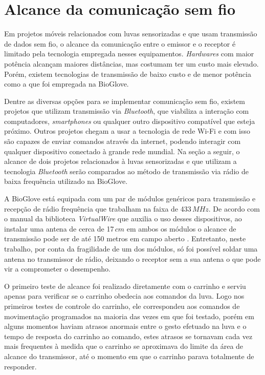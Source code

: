 \documentclass[
	12pt,				%
	openright,			%
	oneside,			%
	a4paper,			%
	english,			%
	brazil				%
	]{abntex2}
\begin{document}
			\section{Alcance da comunicação sem fio}

		Em projetos móveis relacionados com luvas sensorizadas e que usam transmissão de dados sem fio, o alcance da comunicação entre o emissor e o receptor é limitado pela tecnologia empregada nesses equipamentos. \textit{Hardwares} com maior potência alcançam maiores distâncias, mas costumam ter um custo mais elevado. Porém, existem tecnologias de transmissão de baixo custo e de menor potência como a que foi empregada na BioGlove. 
			
		Dentre as diversas opções para se implementar comunicação sem fio, existem projetos que utilizam transmissão via \textit{Bluetooth}, que viabiliza a interação com computadores, \textit{smartphones} ou qualquer outro dispositivo compatível que esteja próximo. Outros projetos chegam a usar a tecnologia de rede Wi-Fi e com isso são capazes de enviar comandos através da internet, podendo interagir com qualquer dispositivo conectado à grande rede mundial. Na seção a seguir, o alcance de dois projetos relacionados à luvas sensorizadas e que utilizam a tecnologia \textit{Bluetooth} serão comparados ao método de transmissão via rádio de baixa frequência utilizado na BioGlove.

		A BioGlove está equipada com um par de módulos genéricos para transmissão e recepção de rádio frequência que trabalham na faixa de 433$\,MHz$. De acordo com o manual da biblioteca \textit{VirtualWire} que auxilia o uso desses dispositivos, ao instalar uma antena de cerca de 17$\,cm$ em ambos os módulos o alcance de transmissão pode ser de até 150 metros em campo aberto \cite{virtualwiremanual}. Entretanto, neste trabalho, por conta da fragilidade de um dos módulos, só foi possível soldar uma antena no transmissor de rádio, deixando o receptor sem a sua antena o que pode vir a comprometer o desempenho.

		O primeiro teste de alcance foi realizado diretamente com o carrinho e serviu apenas para verificar se o carrinho obedecia aos comandos da luva. Logo nos primeiros testes de controle do carrinho, ele correspondeu aos comandos de movimentação programados na maioria das vezes em que foi testado, porém em alguns momentos haviam atrasos anormais entre o gesto efetuado na luva e o tempo de resposta do carrinho ao comando, estes atrasos se tornavam cada vez mais frequentes à medida que o carrinho se aproximava do limite da área de alcance do transmissor, até o momento em que o carrinho parava totalmente de responder.
\end{document}
